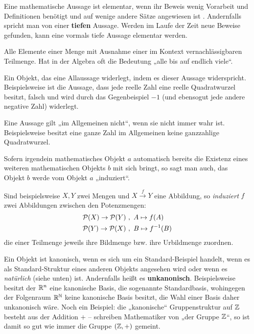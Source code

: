 \begin{description}[labelindent=0pt, leftmargin=0pt]
    \item[Elementar:] Eine mathematische Aussage ist elementar, wenn ihr Beweis wenig Vorarbeit und Definitionen benötigt und auf wenige andere Sätze angewiesen ist . Andernfalls spricht man von einer \textbf{tiefen} Aussage. Werden im Laufe der Zeit neue Beweise gefunden, kann eine vormals tiefe Aussage elementar werden.

    \item[Fast alle:] Alle Elemente einer Menge mit Ausnahme einer im Kontext vernachlässigbaren Teilmenge. Hat in der Algebra oft die Bedeutung „alle bis auf endlich viele“.

    \item[Gegenbeispiel:] Ein Objekt, das eine Allaussage widerlegt, indem es dieser Aussage widerspricht. Beispielsweise ist die Aussage, dass jede reelle Zahl eine reelle Quadratwurzel besitzt, falsch und wird durch das Gegenbeispiel $-1$ (und ebensogut jede andere negative Zahl) widerlegt.

    \item[Im Allgemeinen nicht:] Eine Aussage gilt „im Allgemeinen nicht“, wenn sie nicht immer wahr ist. Beispielsweise besitzt eine ganze Zahl im Allgemeinen keine ganzzahlige Quadratwurzel.
    
    \item[Induzieren:] Sofern irgendein mathematisches Objekt $a$ automatisch bereits die Existenz eines weiteren mathematischen Objekts $b$ mit sich bringt, so sagt man auch, das Objekt $b$ werde vom Objekt $a$ „induziert“.

    Sind beispielsweise $X,Y$ zwei Mengen und $X\xrightarrow{f} Y$ eine Abbildung, so \emph{induziert} $f$ zwei Abbildungen zwischen den Potenzmengen:
    \begin{align*}
        \mathcal P(X) \to \mathcal P(Y) \ & , \ A\mapsto f(A) \\
            \mathcal P(Y) \to \mathcal P(X) \ & , \ B\mapsto f^{-1}(B)
    \end{align*}
    die einer Teilmenge jeweils ihre Bildmenge bzw. ihre Urbildmenge zuordnen.
    
    \item[Kanonisch:] Ein Objekt ist kanonisch, wenn es sich um ein Standard-Beispiel handelt, wenn es als Standard-Struktur eines anderen Objekts angesehen wird oder wenn es \emph{natürlich} (siehe unten) ist. Andernfalls heißt es \textbf{unkanonisch}. Beispielsweise besitzt der $\mathbb R^n$ eine kanonische Basis, die sogenannte Standardbasis, wohingegen der Folgenraum $\mathbb R^\mathbb N$ keine kanonische Basis besitzt, die Wahl einer Basis daher unkanonisch wäre. Noch ein Beispiel: die „kanonische“ Gruppenstruktur auf $\mathbb Z$ besteht aus der Addition $+$ -- schreiben Mathematiker von „der Gruppe $\mathbb Z$“, so ist damit so gut wie immer die Gruppe $(\mathbb Z,+)$ gemeint.


\end{description}
